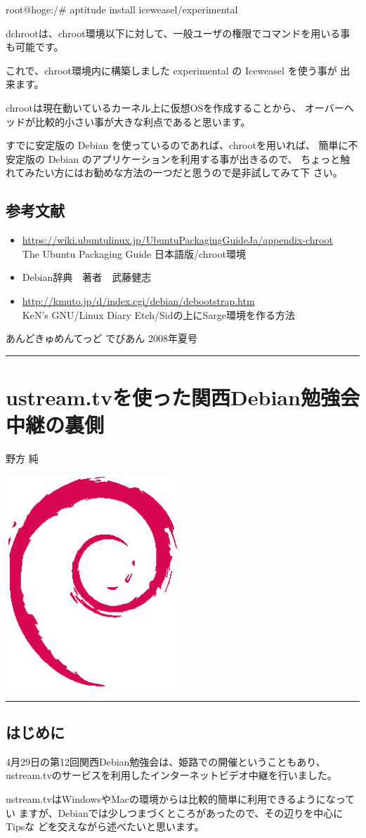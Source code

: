 \documentclass[mingoth,a4paper]{jsarticle}
\renewcommand{\dancersection}[2]{%
\newpage
あんどきゅめんてっど でびあん 2008年夏号
%
\vspace{0.1mm}\\
{\color{dancerlightblue}\rule{\hsize}{2mm}}

%
%
\begin{minipage}[t]{0.6\hsize}
\color{dancerdarkblue}
\vspace{1cm}
\section{#1}
\hfill{}#2\\
\end{minipage}
\begin{minipage}[t]{0.4\hsize}
\vspace{-2cm}
\hfill{}\includegraphics[height=8cm]{image200502/openlogo-nd.eps}\\
\vspace{-5cm}
\end{minipage}
%
%
{\color{dancerdarkblue}\rule{0.74\hsize}{2mm}}
%
\vspace{2cm}
}
\begin{document}
\begin{commandline}
root@hoge:/# aptitude install iceweasel/experimental
\end{commandline}

dchrootは、chroot環境以下に対して、一般ユーザの権限でコマンドを用いる事
も可能です。


これで、chroot環境内に構築しました experimental の Iceweasel を使う事が
出来ます。

chrootは現在動いているカーネル上に仮想OSを作成することから、
オーバーヘッドが比較的小さい事が大きな利点であると思います。

すでに安定版の Debian を使っているのであれば、chrootを用いれば、
簡単に不安定版の Debian のアプリケーションを利用する事が出きるので、
ちょっと触れてみたい方にはお勧めな方法の一つだと思うので是非試してみて下
さい。

\subsection{参考文献}

\begin{itemize}
\item \url{https://wiki.ubuntulinux.jp/UbuntuPackagingGuideJa/appendix-chroot} \\ The Ubuntu Packaging Guide 日本語版/chroot環境
\item Debian辞典　著者　武藤健志
\item \url{http://kmuto.jp/d/index.cgi/debian/debootstrap.htm} \\ KeN's
      GNU/Linux Diary Etch/Sidの上にSarge環境を作る方法
\end{itemize}


\dancersection{ustream.tvを使った関西Debian勉強会中継の裏側}{野方 純}

\subsection{はじめに}

4月29日の第12回関西Debian勉強会は、姫路での開催ということもあり、
ustream.tvのサービスを利用したインターネットビデオ中継を行いました。

ustream.tvはWindowsやMacの環境からは比較的簡単に利用できるようになってい
ますが、Debianでは少しつまづくところがあったので、その辺りを中心にTipsな
どを交えながら述べたいと思います。
\end{document}
